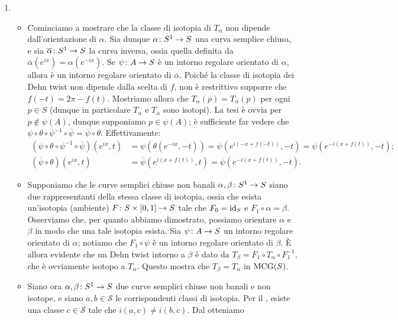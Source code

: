 \begin{enumerate}[(1)]
\item \begin{itemize}
\item Cominciamo a mostrare che la classe di isotopia di $T_\alpha$ non dipende dall'orientazione di $\alpha$. Sia dunque $\map{\alpha}{S^1}{S}$ una curva semplice chiusa, e sia $\map{\overline\alpha}{S^1}{S}$ la curva inversa, ossia quella definita da $\overline\alpha(e^{ix})=\alpha(e^{-ix})$. Se $\map{\psi}{A}{S}$ è un intorno regolare orientato di $\alpha$, allora
è un intorno regolare orientato di $\overline\alpha$. Poiché la classe di isotopia dei Dehn twist non dipende dalla scelta di $f$, non è restrittivo supporre che $f(-t)=2\pi-f(t)$. Mostriamo allora che $T_\alpha(p)=T_{\overline\alpha}(p)$ per ogni $p\in S$ (dunque in particolare $T_\alpha$ e $T_{\overline \alpha}$ sono isotopi). La tesi è ovvia per $p\not\in\psi(A)$, dunque supponiamo $p\in\psi(A)$; è sufficiente far vedere che $\psi\circ\theta\circ\psi^{-1}\circ\overline\psi=\overline\psi\circ\theta$. Effettivamente:
\begin{align*}
(\psi\circ\theta\circ\psi^{-1}\circ\overline\psi)(e^{ix},t)&=\psi(\theta(e^{-ix},-t))=\psi(e^{i(-x+f(-t))},-t)=\psi(e^{-i(x+f(t))},-t);\\
(\overline\psi\circ\theta)(e^{ix},t)&=\overline\psi(e^{i(x+f(t))},t)=\psi(e^{-i(x+f(t))},-t).
\end{align*}
\item Supponiamo che le curve semplici chiuse non banali $\map{\alpha,\beta}{S^1}{S}$ siano due rappresentanti della stessa classe di isotopia, ossia che esista un'isotopia (ambiente) $\map{F}{S\times[0,1]}{S}$ tale che $F_0=\operatorname{id}_S$ e $F_1\circ\alpha=\beta$. Osserviamo che, per quanto abbiamo dimostrato, possiamo orientare $\alpha$ e $\beta$ in modo che una tale isotopia esista. Sia $\map{\psi}{A}{S}$ un intorno regolare orientato di $\alpha$; notiamo che $F_1\circ\psi$ è un intorno regolare orientato di $\beta$. È allora evidente che un Dehn twist intorno a $\beta$ è dato da $T_\beta=F_1\circ T_\alpha\circ F_1^{-1}$, che è ovviamente isotopo a $T_\alpha$. Questo mostra che $T_\beta=T_\alpha$ in $\operatorname{MCG}(S)$.
\item Siano ora $\map{\alpha,\beta}{S^1}{S}$ due curve semplici chiuse non banali e non isotope, e siano $a,b\in\mathcal{S}$ le corrispondenti classi di isotopia. Per il , esiste una classe $c\in\mathcal{S}$ tale che $i(a,c)\neq i(b,c)$. Dal  otteniamo

\end{itemize}
\end{enumerate}
